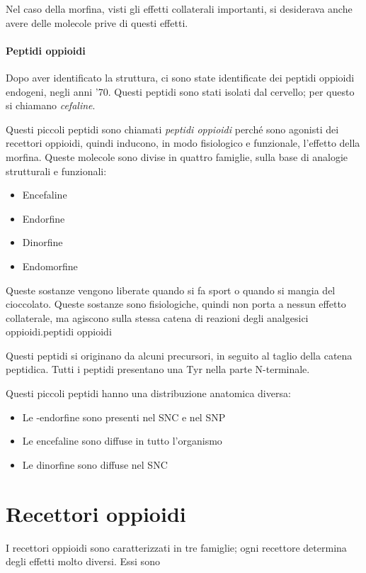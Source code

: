 Nel caso della morfina, visti gli effetti collaterali importanti, si
desiderava anche avere delle molecole prive di questi effetti.

\paragraph{Peptidi oppioidi}
Dopo aver identificato la struttura, ci sono state identificate dei
peptidi oppioidi endogeni, negli anni '70. Questi peptidi sono stati
isolati dal cervello; per questo si chiamano \emph{cefaline}.

Questi piccoli peptidi sono chiamati \emph{peptidi oppioidi} perché sono
agonisti dei recettori oppioidi, quindi inducono, in modo fisiologico e
funzionale, l'effetto della morfina. Queste molecole sono divise in
quattro famiglie, sulla base di analogie strutturali e funzionali:

\begin{itemize}
\item
  Encefaline
\item
  Endorfine
\item
  Dinorfine
\item
  Endomorfine
\end{itemize}

Queste sostanze vengono liberate quando si fa sport o quando si mangia
del cioccolato. Queste sostanze sono fisiologiche, quindi non porta a
nessun effetto collaterale, ma agiscono sulla stessa catena di reazioni
degli analgesici oppioidi.peptidi oppioidi

Questi peptidi si originano da alcuni precursori, in seguito al taglio
della catena peptidica. Tutti i peptidi presentano una Tyr nella parte
N-terminale.

Questi piccoli peptidi hanno una distribuzione anatomica diversa:

\begin{itemize}
\item
  Le \beta-endorfine sono presenti nel SNC e nel SNP
\item
  Le encefaline sono diffuse in tutto l'organismo
\item
  Le dinorfine sono diffuse nel SNC
\end{itemize}

\section{Recettori oppioidi}

I recettori oppioidi sono caratterizzati in tre famiglie; ogni recettore
determina degli effetti molto diversi. Essi sono

